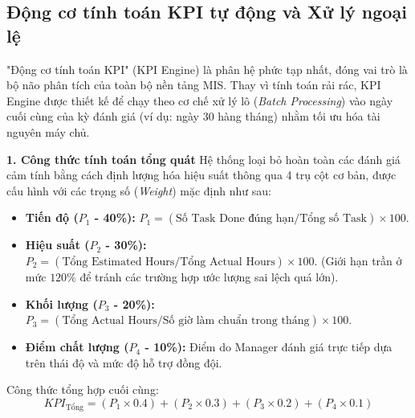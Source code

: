 \documentclass[a4paper,13.5pt]{extreport}
\begin{document}
\subsection{Động cơ tính toán KPI tự động và Xử lý ngoại lệ}

"Động cơ tính toán KPI" (KPI Engine) là phân hệ phức tạp nhất, đóng vai trò là bộ não phân tích của toàn bộ nền tảng MIS. Thay vì tính toán rải rác, KPI Engine được thiết kế để chạy theo cơ chế xử lý lô (\textit{Batch Processing}) vào ngày cuối cùng của kỳ đánh giá (ví dụ: ngày 30 hàng tháng) nhằm tối ưu hóa tài nguyên máy chủ.

\textbf{1. Công thức tính toán tổng quát}
Hệ thống loại bỏ hoàn toàn các đánh giá cảm tính bằng cách định lượng hóa hiệu suất thông qua 4 trụ cột cơ bản, được cấu hình với các trọng số (\textit{Weight}) mặc định như sau:
\begin{itemize}
    \item \textbf{Tiến độ ($P_1$ - 40\%):} $P_1 = (\text{Số Task Done đúng hạn} / \text{Tổng số Task}) \times 100$.
    \item \textbf{Hiệu suất ($P_2$ - 30\%):} $P_2 = (\text{Tổng Estimated Hours} / \text{Tổng Actual Hours}) \times 100$. (Giới hạn trần ở mức $120\%$ để tránh các trường hợp ước lượng sai lệch quá lớn).
    \item \textbf{Khối lượng ($P_3$ - 20\%):} $P_3 = (\text{Tổng Actual Hours} / \text{Số giờ làm chuẩn trong tháng}) \times 100$.
    \item \textbf{Điểm chất lượng ($P_4$ - 10\%):} Điểm do Manager đánh giá trực tiếp dựa trên thái độ và mức độ hỗ trợ đồng đội.
\end{itemize}

Công thức tổng hợp cuối cùng:
$$KPI_{\text{Tổng}} = (P_1 \times 0.4) + (P_2 \times 0.3) + (P_3 \times 0.2) + (P_4 \times 0.1)$$
\end{document}
